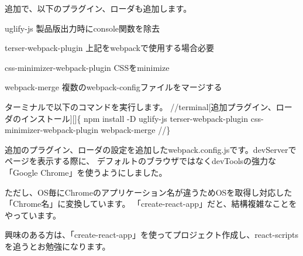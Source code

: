 {}

\vspace*{\baselineskip}

追加で、以下のプラグイン、ローダも追加します。

\begin{starteritemize}
\item uglify{-}js 製品版出力時にconsole関数を除去
\item terser{-}webpack{-}plugin 上記をwebpackで使用する場合必要
\item css{-}minimizer{-}webpack{-}plugin CSSをminimize
\item webpack{-}merge 複数のwebpack{-}configファイルをマージする
\end{starteritemize}

ターミナルで以下のコマンドを実行します。
//terminal[追加プラグイン、ローダのインストール][]\{
npm install {-}D uglify{-}js terser{-}webpack{-}plugin css{-}minimizer{-}webpack{-}plugin webpack{-}merge
//\}

追加のプラグイン、ローダの設定を追加したwebpack.config.jsです。devServerでページを表示する際に、
デフォルトのブラウザではなくdevToolsの強力な「Google Chrome」を使うようにしました。

\vspace*{\baselineskip}

ただし、OS毎にChromeのアプリケーション名が違うためOSを取得し対応した「Chrome名」に変換しています。
「create{-}react{-}app」だと、結構複雑なことをやっています。

興味のある方は、「create{-}react{-}app」を使ってプロジェクト作成し、react{-}scriptsを追うとお勉強になります。


